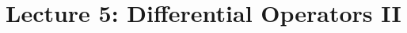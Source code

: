 % 
\section{Lecture 5: Differential Operators II} %
\label{sec:lecture_5_differential_operators_ii}

